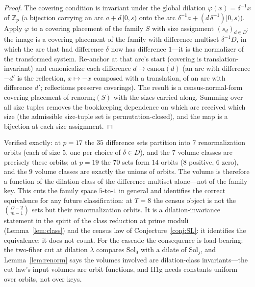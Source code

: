 \documentclass[11pt,a4paper]{article}
\numberwithin{equation}{section}
\theoremstyle{plain}
\theoremstyle{definition}
\theoremstyle{remark}
\newcommand{\Z}{\mathbb{Z}}
\begin{document}
\begin{proof}
The covering condition is invariant under the global dilation
$\varphi(x)=\delta^{-1}x$ of $\Z_p$ (a bijection carrying an arc
$a+d\,[0,s)$ onto the arc $\delta^{-1}a+(d\,\delta^{-1})[0,s)$). Apply
$\varphi$ to a covering placement of the family $S$ with size
assignment $(s_d)_{d\in D}$: the image is a covering placement of the
family with difference multiset $\delta^{-1}D$, in which the arc that
had difference $\delta$ now has difference $1$---it is the normalizer
of the transformed system. Re-anchor at that arc's start (covering is
translation-invariant) and canonicalize each difference
$d\mapsto\mathrm{canon}(d)$ (an arc with difference $-d'$ is the
reflection, $x\mapsto-x$ composed with a translation, of an arc with
difference $d'$; reflections preserve coverings). The result is a
census-normal-form covering placement of
$\mathrm{renorm}_\delta(S)$ with the sizes carried along. Summing over
all size tuples removes the bookkeeping dependence on which arc
received which size (the admissible size-tuple set is
permutation-closed), and the map is a bijection at each size
assignment.
\end{proof}

Verified exactly: at $p=17$ the $35$ difference sets partition into
$7$ renormalization orbits (each of size $5$, one per choice of
$\delta\in D$), and the $7$ volume classes are precisely these orbits;
at $p=19$ the $70$ sets form $14$ orbits ($8$ positive, $6$ zero), and
the $9$ volume classes are exactly the unions of orbits. The volume is
therefore a function of the dilation class of the difference multiset
alone---not of the family key. This cuts the family space $5$-to-$1$
in general and identifies the correct equivalence for any future
classification: at $T=8$ the census object is not the
$\binom{D-2}{m-1}$ sets but their renormalization orbits. It is a
dilation-invariance statement in the spirit of the class reduction at
prime moduli (Lemma~\ref{lem:class}) and the census law of
Conjecture~\ref{conj:SL}: it identifies the equivalence; it does not
count. For the cascade the consequence is load-bearing: the two-fiber
cut at dilation $\lambda$ compares $\mathrm{Sol}_0$ with a dilate of
$\mathrm{Sol}_j$, and Lemma~\ref{lem:renorm} says the volumes involved
are dilation-class invariants---the cut law's input volumes are orbit
functions, and H1g needs constants uniform over orbits, not over keys.
\end{document}
